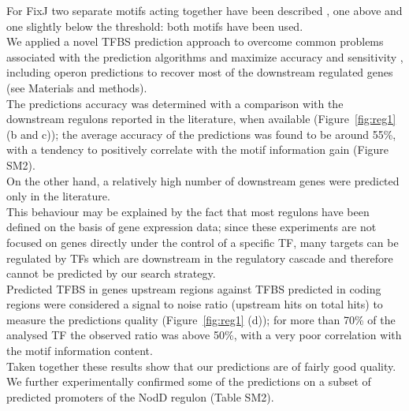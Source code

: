 For FixJ two separate motifs acting together have been described \cite{ferrieres2002two}, one above and one slightly below the threshold: both motifs have been used.\\
We applied a novel TFBS prediction approach to overcome common problems associated with the prediction algorithms and maximize accuracy and sensitivity \cite{van2009mechanisms}, including operon predictions to recover most of the downstream regulated genes (see Materials and methods).\\
 The predictions accuracy was determined with a comparison with the downstream regulons reported in the literature, when available (Figure~\ref{fig:reg1} (b and c)); the average accuracy of the predictions was found to be around 55\%, with a tendency to positively correlate with the motif information gain (Figure SM2).\\
On the other hand, a relatively high number of downstream genes were predicted only in the literature.\\
This behaviour may be explained by the fact that most regulons have been defined on the basis of gene expression data; since these experiments are not focused on genes directly under the control of a specific TF, many targets can be regulated by TFs which are downstream in the regulatory cascade and therefore cannot be predicted by our search strategy.\\
Predicted TFBS in genes upstream regions against TFBS predicted in coding regions were considered a signal to noise ratio (upstream hits on total hits) to measure the predictions quality (Figure~\ref{fig:reg1} (d)); for more than 70\% of the analysed TF the observed ratio was above 50\%, with a very poor correlation with the motif information content.\\
Taken together these results show that our predictions are of fairly good quality. We further experimentally confirmed some of the predictions on a subset of predicted promoters of the NodD regulon (Table SM2).\\%
